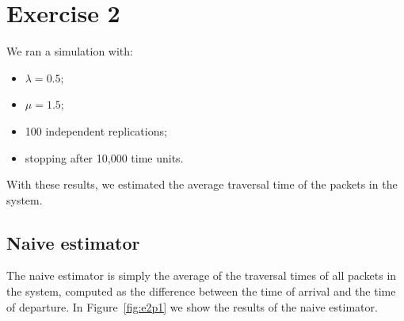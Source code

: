 \documentclass[a4paper]{article}
\begin{document}
\section*{Exercise 2}

We ran a simulation with:
\begin{itemize}
    \setlength\itemsep{0.01em}
  \item $\lambda = 0.5$;
  \item $\mu = 1.5$;
  \item 100 independent replications;
  \item stopping after 10,000 time units.
\end{itemize}

With these results, we estimated the average traversal time of the packets in the system.

\subsection*{Naive estimator}

The naive estimator is simply the average of the traversal times of all packets in the system, computed as the difference between the time of arrival and the time of departure. In Figure~\ref{fig:e2p1} we show the results of the naive estimator.
\end{document}
